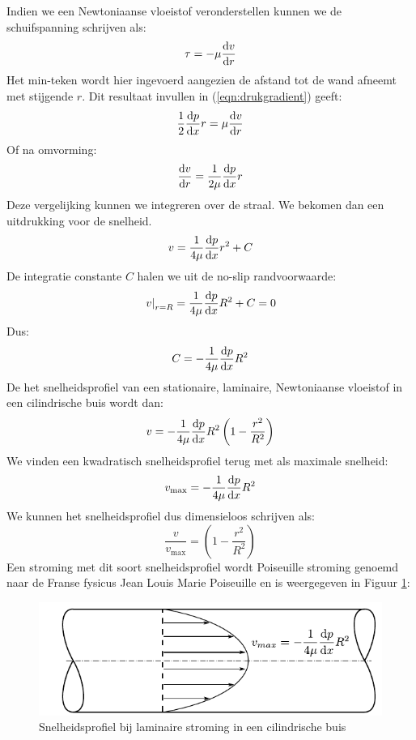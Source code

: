 Indien we een Newtoniaanse vloeistof veronderstellen kunnen we de schuifspanning schrijven als:
\begin{equation}
	\tau = -\mu \frac{\mathrm{d} v}{\mathrm{d} r}
\end{equation}
Het min-teken wordt hier ingevoerd aangezien de afstand tot de wand afneemt met stijgende $r$. Dit resultaat invullen in (\ref{eqn:drukgradient}) geeft:
\begin{equation}
	\frac{1}{2} \frac{\mathrm{d} p}{\mathrm{d} x} r = \mu \frac{\mathrm{d} v}{\mathrm{d} r}
\end{equation}
Of na omvorming:
\begin{equation}
	\frac{\mathrm{d} v}{\mathrm{d} r} = \frac{1}{2 \mu}\frac{\mathrm{d} p}{\mathrm{d} x} r
\end{equation}
Deze vergelijking kunnen we integreren over de straal. We bekomen dan een uitdrukking voor de snelheid.
\begin{equation}
	v = \frac{1}{4 \mu}\frac{\mathrm{d} p}{\mathrm{d} x} r^2 + C
\end{equation}
De integratie constante $C$ halen we uit de no-slip randvoorwaarde:
\begin{equation}
	\left.v\right|_{r=R} = \frac{1}{4 \mu}\frac{\mathrm{d} p}{\mathrm{d} x} R^2 + C  = 0
\end{equation}
Dus:
\begin{equation}
	C = - \frac{1}{4 \mu}\frac{\mathrm{d} p}{\mathrm{d} x} R^2
\end{equation}
De het snelheidsprofiel van een stationaire, laminaire, Newtoniaanse vloeistof in een cilindrische buis wordt dan:
\begin{equation}
	v = - \frac{1}{4 \mu}\frac{\mathrm{d} p}{\mathrm{d} x} R^2 \left(1- \frac{r^2}{R^2}\right)
\end{equation}
We vinden een kwadratisch snelheidsprofiel terug met als maximale snelheid:
\begin{equation}
	v_{\text{max}} = - \frac{1}{4 \mu}\frac{\mathrm{d} p}{\mathrm{d} x} R^2
\end{equation}
We kunnen het snelheidsprofiel dus dimensieloos schrijven als:
\begin{equation}
	\frac{v}{v_{\text{max}}} = \left(1- \frac{r^2}{R^2}\right)
\end{equation}
Een stroming met dit soort snelheidsprofiel wordt Poiseuille stroming genoemd naar de Franse fysicus Jean Louis Marie Poiseuille en is weergegeven in Figuur \ref{fig:laminair_snelheidsprofiel}:
\begin{figure}[htb]
	\centering
	\includegraphics{fig/stroming_in_leidingen/Laminair_snelheidsprofiel}
	\caption{Snelheidsprofiel bij laminaire stroming in een cilindrische buis}
	\label{fig:laminair_snelheidsprofiel}
\end{figure}

